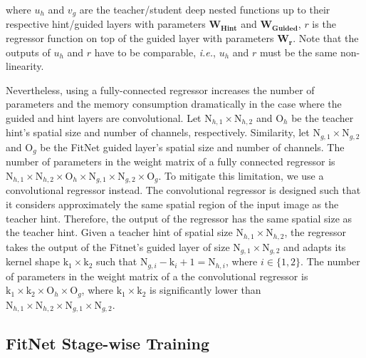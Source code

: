 \documentclass{article} %
\begin{document}
where $u_{h}$ and $v_{g}$ are the teacher/student deep nested functions up to
their respective hint/guided layers with parameters $\mathbf{W_{Hint}}$ and
$\mathbf{W_{Guided}}$, $r$ is the regressor function on top of the guided
layer with parameters $\mathbf{W_r}$. Note that the outputs of $u_{h}$ and $r$
have to be comparable, \textit{i.e.}, $u_{h}$ and $r$ must be the same non-linearity.

Nevertheless, using a fully-connected regressor increases the number of
parameters and the memory consumption dramatically in the case
where the guided and hint layers are convolutional. Let $\mathrm{N}_{h,1}
\times \mathrm{N}_{h,2}$ and $\mathrm{O}_{h}$ be the teacher hint's spatial
size and number of channels, respectively. Similarity, let $\mathrm{N}_{g,1}
\times \mathrm{N}_{g,2}$ and $\mathrm{O}_{g}$ be the FitNet guided layer's spatial
size and number of channels. The number of parameters in the weight matrix of
a fully connected regressor is $\mathrm{N}_{h,1} \times \mathrm{N}_{h,2}
\times \mathrm{O}_{h} \times \mathrm{N}_{g,1} \times \mathrm{N}_{g,2} \times
\mathrm{O}_{g}$. To mitigate this limitation, we use a convolutional regressor
instead. The convolutional regressor is designed such that it considers
approximately the same spatial region of the input image as the teacher
hint. Therefore, the output of the regressor has the same spatial size as the
teacher hint. Given a teacher hint of spatial size $\mathrm{N}_{h,1} \times
\mathrm{N}_{h,2}$, the regressor takes the output of the Fitnet's guided
layer of size $\mathrm{N}_{g,1} \times \mathrm{N}_{g,2}$ and adapts its kernel
shape $\mathrm{k_1} \times \mathrm{k_2}$ such that $\mathrm{N}_{g,i} -
\mathrm{k}_i + 1 = \mathrm{N}_{h,i}$, where $i \in \{1,2\}$. The number of
parameters in the weight matrix of a the convolutional regressor is
$\mathrm{k_1} \times \mathrm{k_2} \times \mathrm{O}_{h} \times
\mathrm{O}_{g}$, where $\mathrm{k_1} \times \mathrm{k_2}$ is significantly
lower than $\mathrm{N}_{h,1} \times \mathrm{N}_{h,2} \times \mathrm{N}_{g,1}
\times \mathrm{N}_{g,2}$.

\vspace*{-1mm}
\subsection{FitNet Stage-wise Training}
\vspace*{-1mm}
\end{document}
